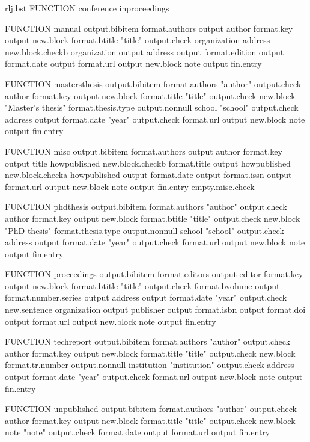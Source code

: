 \begin{filecontents*}{rlj.bst}
FUNCTION {conference} { inproceedings }

FUNCTION {manual}
{ output.bibitem
  format.authors output
  author format.key output
  new.block
  format.btitle "title" output.check
  organization address new.block.checkb
  organization output
  address output
  format.edition output
  format.date output
  format.url output
  new.block
  note output
  fin.entry
}

FUNCTION {mastersthesis}
{ output.bibitem
  format.authors "author" output.check
  author format.key output
  new.block
  format.title "title" output.check
  new.block
  "Master's thesis" format.thesis.type output.nonnull
  school "school" output.check
  address output
  format.date "year" output.check
  format.url output
  new.block
  note output
  fin.entry
}

FUNCTION {misc}
{ output.bibitem
  format.authors output
  author format.key output
  title howpublished new.block.checkb
  format.title output
  howpublished new.block.checka
  howpublished output
  format.date output
  format.issn output
  format.url output
  new.block
  note output
  fin.entry
  empty.misc.check
}

FUNCTION {phdthesis}
{ output.bibitem
  format.authors "author" output.check
  author format.key output
  new.block
  format.btitle "title" output.check
  new.block
  "PhD thesis" format.thesis.type output.nonnull
  school "school" output.check
  address output
  format.date "year" output.check
  format.url output
  new.block
  note output
  fin.entry
}

FUNCTION {proceedings}
{ output.bibitem
  format.editors output
  editor format.key output
  new.block
  format.btitle "title" output.check
  format.bvolume output
  format.number.series output
  address output
  format.date "year" output.check
  new.sentence
  organization output
  publisher output
  format.isbn output
  format.doi output
  format.url output
  new.block
  note output
  fin.entry
}

FUNCTION {techreport}
{ output.bibitem
  format.authors "author" output.check
  author format.key output
  new.block
  format.title "title" output.check
  new.block
  format.tr.number output.nonnull
  institution "institution" output.check
  address output
  format.date "year" output.check
  format.url output
  new.block
  note output
  fin.entry
}

FUNCTION {unpublished}
{ output.bibitem
  format.authors "author" output.check
  author format.key output
  new.block
  format.title "title" output.check
  new.block
  note "note" output.check
  format.date output
  format.url output
  fin.entry
}


\end{filecontents*}
